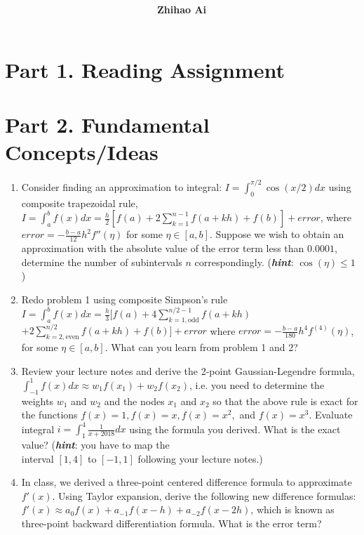 \documentclass[10pt]{report}
\title{
	\vspace{2in}
	\textmd{\textbf{\hwCourse\\\hwTitle}}\\
	\vspace{0.3in}\large{\textit{\hmwkClassInstructor}}
	\vspace{3in}
}
\author{\textbf{Zhihao Ai}}
\date{}
\newcommand{\dintt}[4] {\int_{#1}^{#2} #3 d#4}
\begin{document}
\maketitle

\section*{Part 1. Reading Assignment}

\section*{Part 2. Fundamental Concepts/Ideas}
\begin{enumerate}
	\item 
	Consider finding an approximation to integral: $I = \dintt{0}{\pi/2}{\cos(x/2)}{x}$ using composite trapezoidal rule, $I = \dintt{a}{b}{f(x)}{x} = \frac{h}{2}[f(a) + 2\sum_{k=1}^{n-1}f(a+kh) + f(b) ] + error$, where $error = -\frac{b-a}{12}h^2 f''(\eta)$ for some $\eta\in [a,b]$. Suppose we wish to obtain an approximation with the absolute value of the error term less than $0.0001$, determine the number of subintervals $n$ correspondingly. (\textit{\textbf{hint}}: $\cos(\eta) \le 1$)
	
	\item 
	Redo problem 1 using composite Simpson’s rule $I = \dintt{a}{b}{f(x)}{x} = \frac{h}{3}[f(a) + 4\sum_{k=1, \text{odd}}^{n/2-1}f(a+kh) $
	$ + 2\sum_{k=2, \text{even}}^{n/2}f(a+kh) + f(b) ] + error$ where $error = -\frac{b-a}{180}h^4f^{(4)}(\eta)$, for some $\eta\in [a,b]$. What can you learn from problem 1 and 2?
	
	\item 
	Review your lecture notes and derive the 2-point Gaussian-Legendre formula, $\dintt{-1}{1}{f(x)}{x} \approx w_1 f(x_1) + w_2 f(x_2)$, i.e. you need to determine the weights $w_1$ and $w_2$ and the nodes $x_1$ and $x_2$ so that the above rule is exact for the functions $f(x)=1, f(x)=x, f(x)=x^2,$ and $f(x)=x^3$. Evaluate integral $i = \dintt{1}{4}{\frac{1}{x+2018}}{x}$ using the formula you derived. What is the exact value? (\textit{\textbf{hint}}: you have to map the\\[0.5 ex]
	interval $[1, 4]$ to $[-1,1]$ following your lecture notes.)
	
	\item 
	In class, we derived a three-point centered difference formula to approximate $f'(x)$. Using Taylor expansion, derive the following new difference formulas: $f'(x)\approx a_0 f(x) + a_{-1}f(x-h) + a_{-2}f(x-2h)$, which is known as three-point backward differentiation formula. What is the error term?
\end{enumerate}
\end{document}

